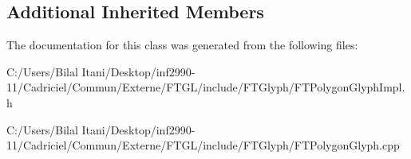 \subsection*{Additional Inherited Members}


The documentation for this class was generated from the following files\+:\begin{DoxyCompactItemize}
\item 
C\+:/\+Users/\+Bilal Itani/\+Desktop/inf2990-\/11/\+Cadriciel/\+Commun/\+Externe/\+F\+T\+G\+L/include/\+F\+T\+Glyph/F\+T\+Polygon\+Glyph\+Impl.\+h\item 
C\+:/\+Users/\+Bilal Itani/\+Desktop/inf2990-\/11/\+Cadriciel/\+Commun/\+Externe/\+F\+T\+G\+L/include/\+F\+T\+Glyph/F\+T\+Polygon\+Glyph.\+cpp\end{DoxyCompactItemize}
